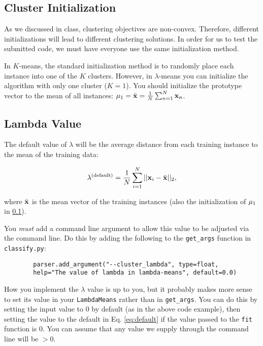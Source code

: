 \documentclass[11pt]{article}
\newcommand{\vx}{{\bf x}}
\newcommand{\vxi}{{\bf x}_i}
\newcommand{\vxn}{{\bf x}_n}
\newcommand{\vmu}{{\bf \mu}}
\newcommand{\code}[1]{{\footnotesize \tt #1}}
\begin{document}
\subsection{Cluster Initialization}
\label{sec:initial}
As we discussed in class, clustering objectives are non-convex. Therefore, different initializations will lead to different clustering solutions. In order for us to test the submitted code, we must have everyone use the same initialization method.

In $K$-means, the standard initialization method is to randomly place each instance into one of the $K$ clusters. However, in $\lambda$-means you can initialize the algorithm with only one cluster ($K=1$). You should initialize the prototype vector to the mean of all instances: $\vmu_1 = \bar{\vx} = \frac{1}{N} \sum_{n=1}^{N} \vxn$.

\subsection{Lambda Value}

The default value of $\lambda$ will be the average distance from each training instance to the mean of the training data:

\begin{equation}
\label{eq:default}
\lambda^{\textrm{\scriptsize (default)}} =  \frac{1}{N} \sum_{i=1}^{N} ||\vxi-\bar{\vx}||_2,   
\end{equation}

\noindent where $\bar{\vx}$ is the mean vector of the training instances (also the initialization of $\vmu_1$ in \ref{sec:initial}).

You \emph{must} add a command line argument to allow this value to be adjusted via the command line.  Do this by
adding the following to the \code{get\_args} function in \code{classify.py}:
	\begin{footnotesize}
		\begin{verbatim}
		parser.add_argument("--cluster_lambda", type=float, 
		help="The value of lambda in lambda-means", default=0.0)
		\end{verbatim}
	\end{footnotesize}

How you implement the $\lambda$ value is up to you, but it probably makes more sense to set its value in your \code{LambdaMeans} rather than in \code{get\_args}. You can do this by setting the input value to 0 by default (as in the above code example), then setting the value to the default in Eq. \ref{eq:default} if the value passed to the \code{fit} function is 0. You can assume that any value we supply through the command line will be $>0$.
\end{document}
